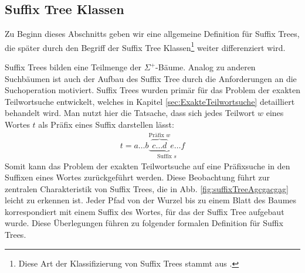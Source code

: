 \documentclass[12pt]{report}
\begin{document}
\subsection{Suffix Tree Klassen}
\label{sec:suffixTreeKlassen}

Zu Beginn dieses Abschnitts geben wir eine allgemeine Definition für Suffix Trees, die später durch den Begriff der Suffix Tree Klassen\footnote{Diese Art der Klassifizierung von Suffix Trees stammt aus \cite{Giegerich1995}.} weiter differenziert wird.

Suffix Trees bilden eine Teilmenge der $\Sigma^+$-Bäume. Analog zu anderen Suchbäumen ist auch der Aufbau des Suffix Tree durch die Anforderungen an die Suchoperation motiviert. Suffix Trees wurden primär für das Problem der exakten Teilwortsuche entwickelt, welches in Kapitel \ref{sec:ExakteTeilwortsuche} detailliert behandelt wird. Man nutzt hier die Tatsache, dass sich jedes Teilwort $w$ eines Wortes $t$ als Präfix eines Suffix darstellen lässt:
\begin{gather*}
    t = a \dots b \underbrace{\overbrace{c \dots d}^{\text{Präfix }w} e \dots f}_{\text{Suffix }s}
\end{gather*}
Somit kann das Problem der exakten Teilwortsuche auf eine Präfixsuche in den Suffixen eines Wortes zurückgeführt werden. Diese Beobachtung führt zur zentralen Charakteristik von Suffix Trees, die in Abb. \ref{fig:suffixTreeAgcgacgag} leicht zu erkennen ist. Jeder Pfad von der Wurzel bis zu einem Blatt des Baumes korrespondiert mit einem Suffix des Wortes, für das der Suffix Tree aufgebaut wurde. Diese Überlegungen führen zu folgender formalen Definition für Suffix Trees.
\end{document}
